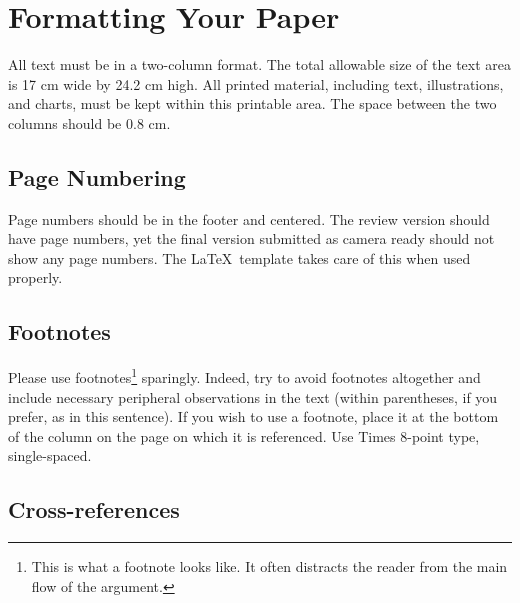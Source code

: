 \section{Formatting Your Paper}
\label{sec:formatting}

All text must be in a two-column format.
The total allowable size of the text area is 17 cm wide by 24.2 cm high.
All printed material, including text, illustrations, and charts, must be kept within this printable area.
The space between the two columns should be 0.8 cm.


\subsection{Page Numbering}

Page numbers should be in the footer and centered.
The review version should have page numbers, yet the final version submitted as camera ready should not show any page numbers.
The \LaTeX\ template takes care of this when used properly.


\subsection{Footnotes}

Please use footnotes\footnote{This is what a footnote looks like.
It often distracts the reader from the main flow of the argument.} sparingly.
Indeed, try to avoid footnotes altogether and include necessary peripheral observations in the text (within parentheses, if you prefer, as in this sentence).
If you wish to use a footnote, place it at the bottom of the column on the page on which it is referenced.
Use Times 8-point type, single-spaced.


\subsection{Cross-references}

